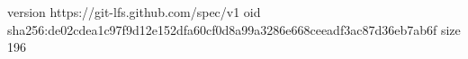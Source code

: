 version https://git-lfs.github.com/spec/v1
oid sha256:de02cdea1c97f9d12e152dfa60cf0d8a99a3286e668ceeadf3ac87d36eb7ab6f
size 196
